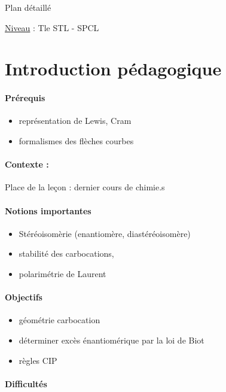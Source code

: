\begin{reportBlock}{Plan détaillé}

\underline{Niveau} : Tle STL - SPCL \\

\section*{Introduction pédagogique}


\paragraph*{Prérequis}
\begin{itemize}
\item représentation de Lewis, Cram
\item formalismes des flèches courbes
\end{itemize}

\paragraph*{Contexte :}
Place de la leçon : dernier cours de chimie.s

\paragraph*{Notions importantes}

\begin{itemize}
\item Stéréoisomèrie (enantiomère, diastéréoisomère)
\item stabilité des carbocations,
\item polarimétrie de Laurent
\end{itemize}

\paragraph*{Objectifs}

\begin{itemize}
\item géométrie carbocation
\item déterminer excès énantiomérique par la loi de Biot
\item règles CIP
\end{itemize}

\paragraph*{Difficultés}


\end{reportBlock}
